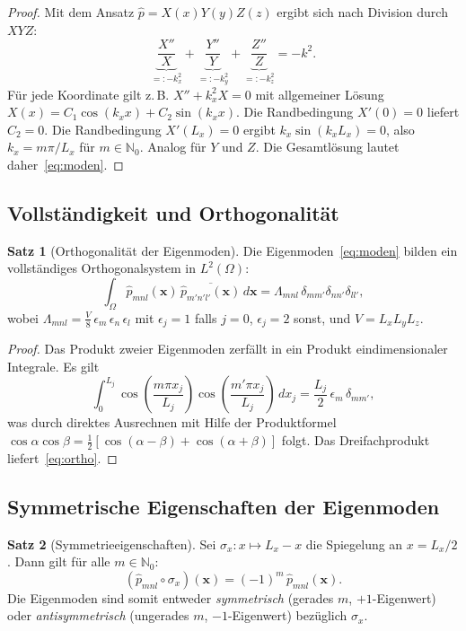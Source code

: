 ﻿\documentclass[12pt, a4paper]{article}
\theoremstyle{definition}
\newtheorem{satz}{Satz}[section]
\theoremstyle{remark}
\newcommand{\N}{\mathbb{N}}
\newcommand{\Lx}{L_x}
\newcommand{\Ly}{L_y}
\newcommand{\Lz}{L_z}
\begin{document}
\begin{proof}
Mit dem Ansatz $\hat{p} = X(x)Y(y)Z(z)$ ergibt sich nach Division durch $XYZ$:
\[
  \underbrace{\frac{X''}{X}}_{=:-k_x^2}
  + \underbrace{\frac{Y''}{Y}}_{=:-k_y^2}
  + \underbrace{\frac{Z''}{Z}}_{=:-k_z^2}
  = -k^2.
\]
Für jede Koordinate gilt z.\,B. $X'' + k_x^2 X = 0$ mit allgemeiner Lösung
$X(x) = C_1\cos(k_x x) + C_2\sin(k_x x)$.
Die Randbedingung $X'(0) = 0$ liefert $C_2 = 0$.
Die Randbedingung $X'(\Lx) = 0$ ergibt $k_x \sin(k_x \Lx) = 0$,
also $k_x = m\pi/\Lx$ für $m \in \N_0$. Analog für $Y$ und $Z$.
Die Gesamtlösung lautet daher~\eqref{eq:moden}. 
\end{proof}

\subsection{Vollständigkeit und Orthogonalität}

\begin{satz}[Orthogonalität der Eigenmoden]
\label{satz:orth}
Die Eigenmoden~\eqref{eq:moden} bilden ein vollständiges Orthogonalsystem
in $L^2(\Omega)$:
\begin{equation}
  \int_\Omega \hat{p}_{mnl}(\mathbf{x})\,\overline{\hat{p}_{m'n'l'}(\mathbf{x})}\,d\mathbf{x}
  = \Lambda_{mnl}\,\delta_{mm'}\delta_{nn'}\delta_{ll'},
  \label{eq:ortho}
\end{equation}
wobei $\Lambda_{mnl} = \frac{V}{8}\,\epsilon_m\,\epsilon_n\,\epsilon_l$
mit $\epsilon_j = 1$ falls $j=0$, $\epsilon_j = 2$ sonst, und $V = \Lx\Ly\Lz$.
\end{satz}

\begin{proof}
Das Produkt zweier Eigenmoden zerfällt in ein Produkt eindimensionaler
Integrale. Es gilt
\[
  \int_0^{L_j} \cos\!\left(\frac{m\pi x_j}{L_j}\right)
  \cos\!\left(\frac{m'\pi x_j}{L_j}\right)\,dx_j
  = \frac{L_j}{2}\,\epsilon_m\,\delta_{mm'},
\]
was durch direktes Ausrechnen mit Hilfe der Produktformel
$\cos\alpha\cos\beta = \frac{1}{2}[\cos(\alpha-\beta)+\cos(\alpha+\beta)]$
folgt. Das Dreifachprodukt liefert~\eqref{eq:ortho}. 
\end{proof}

\subsection{Symmetrische Eigenschaften der Eigenmoden}

\begin{satz}[Symmetrieeigenschaften]
\label{satz:sym}
Sei $\sigma_x: x \mapsto \Lx - x$ die Spiegelung an $x = \Lx/2$.
Dann gilt für alle $m \in \N_0$:
\begin{equation}
  (\hat{p}_{mnl} \circ \sigma_x)(\mathbf{x}) = (-1)^m\,\hat{p}_{mnl}(\mathbf{x}).
  \label{eq:sym_mode}
\end{equation}
Die Eigenmoden sind somit entweder \emph{symmetrisch} (gerades $m$, $+1$-Eigenwert)
oder \emph{antisymmetrisch} (ungerades $m$, $-1$-Eigenwert) bezüglich $\sigma_x$.
\end{satz}
\end{document}
